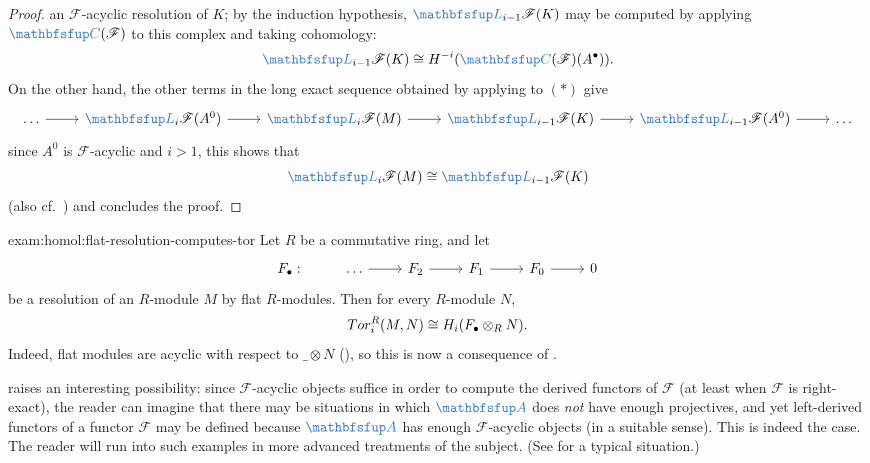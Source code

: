 \begin{proof}
  an $\mathscr{F}$-acyclic resolution of $K$; by the induction
  hypothesis, $\categ{L}_{i-1}\mathscr{F}(K)$ may be computed by
  applying $\categ{C}(\mathscr{F})$ to this complex and taking
  cohomology:
  \[
    \categ{L}_{i-1}\mathscr{F}(K) \cong
    H^{-i}(\categ{C}(\mathscr{F})(A^\bullet)).
  \]
  On the other hand, the other terms in the long exact sequence
  obtained by applying  to $(*)$ give
  \[\begin{tikzcd}
      \dots \arrow[r] & \categ{L}_i\mathscr{F}(A^0) \arrow[r] &
      \categ{L}_i\mathscr{F}(M) \arrow[r] &
      \categ{L}_{i-1}\mathscr{F}(K) \arrow[r] &
      \categ{L}_{i-1}\mathscr{F}(A^0) \arrow[r] & \dots
    \end{tikzcd}\] since $A^0$ is $\mathscr{F}$-acyclic and $i > 1$,
  this shows that
  \[
    \categ{L}_i\mathscr{F}(M) \cong \categ{L}_{i-1}\mathscr{F}(K)
  \]
  (also cf.\ )
  and concludes the proof.
\end{proof}

\begin{exam}{}{exam:homol:flat-resolution-computes-tor}
  Let $R$ be a commutative ring, and let
  \[\begin{tikzcd}
      F_\bullet : & \dots \arrow[r] & F_2 \arrow[r] & F_1 \arrow[r] &
      F_0 \arrow[r] & 0
    \end{tikzcd}\] be a resolution of an $R$-module $M$ by flat
  $R$-modules. Then for every $R$-module $N$,
  \[
    Tor^R_i(M, N) \cong H_i(F_\bullet \otimes_R N).
  \]
  Indeed, flat modules are acyclic with respect to $\_ \otimes N$
  (), so this is now a consequence of
  .
\end{exam}

 raises an interesting possibility: since
$\mathscr{F}$-acyclic objects suffice in order to compute the derived
functors of $\mathscr{F}$ (at least when $\mathscr{F}$ is
right-exact), the reader can imagine that there may be situations in
which $\categ{A}$ does \emph{not} have enough projectives, and yet
left-derived functors of a functor $\mathscr{F}$ may be defined
because $\categ{A}$ has enough $\mathscr{F}$-acyclic objects (in a
suitable sense). This is indeed the case. The reader will run into
such examples in more advanced treatments of the subject. (See
 for a typical
situation.)

